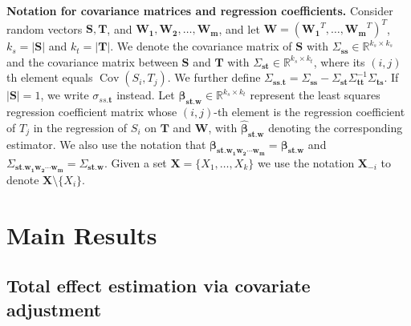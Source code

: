 \documentclass[11pt,a4paper]{article}
\theoremstyle{definition}
\theoremstyle{remark}
\newcommand\ci{\protect\mathpalette{\protect\independenT}{\perp}}
\def\independenT#1#2{\mathrel{\rlap{$#1#2$}\mkern2mu{#1#2}}}
\DeclareMathOperator{\Cov}{Cov}
\newcommand{\g}[1][G]{\mathcal{#1}}
\newcommand{\vsp}{\vspace{.2cm}}
\begin{document}

\vsp


\noindent\textbf{Notation for covariance matrices and regression coefficients.}
Consider random vectors $\mathbf{S}, \mathbf{T}$, and $\mathbf{W_1}, \mathbf{W_2}, \dots, \mathbf{W_m}$, and let $\mathbf{W}=(\mathbf{W_1}^T, \dots, \mathbf{W_m}^T)^T$, $k_s=|\mathbf{S}|$ and $k_t=|\mathbf{T}|$. 
We denote the covariance matrix of $\mathbf{S}$ with $\Sigma_{\mathbf{ss}} \in\mathbb{R}^{k_s \times k_s}$ and the covariance matrix between $\mathbf{S}$ and $\mathbf{T}$ with $\Sigma_{\mathbf{st}}  \in \mathbb{R}^{k_s \times k_t}$, where its $(i,j)$th element equals $\Cov(S_i,T_j)$. We further define 
$\Sigma_{\mathbf{ss}.\mathbf{t}} = \Sigma_{\mathbf{ss}} - \Sigma_{\mathbf{st}} \Sigma^{-1}_{\mathbf{tt}} \Sigma_{\mathbf{ts}}$. If $|\mathbf{S}|=1$, we write $\sigma_{ss.\mathbf{t}}$ instead. 
Let $\boldsymbol{\beta}_{\mathbf{s}\mathbf{t}.\mathbf{w}} \in \mathbb{R}^{k_s \times k_t}$ represent the least squares regression coefficient matrix whose $(i,j)$-th element is the regression coefficient of $T_j$ in the regression of $S_i$ on $\mathbf{T}$ and $ \mathbf{W}$, with $\boldsymbol{\hat{\beta}}_{\mathbf{st}.\mathbf{w}}$ denoting the corresponding estimator.  We also use the notation that $\boldsymbol{\beta}_{\mathbf{st}.{\mathbf{w_1w_2}\cdots \mathbf{w_m}}} = \boldsymbol{\beta}_{\mathbf{st}.{\mathbf{w}}}$ and $\Sigma_{\mathbf{s}\mathbf{t}.{\mathbf{w_1w_2}\cdots \mathbf{w_m}}} = \Sigma_{\mathbf{s}\mathbf{t}.\mathbf{w}} $. Given a set $\mathbf{X}=\{X_1,\dots,X_k\}$ we use the notation $\mathbf{X}_{-i}$ to denote $\mathbf{X} \setminus \{X_i\}$.


\section{Main Results} \label{main}

\subsection{Total effect estimation via covariate adjustment}
\end{document}
